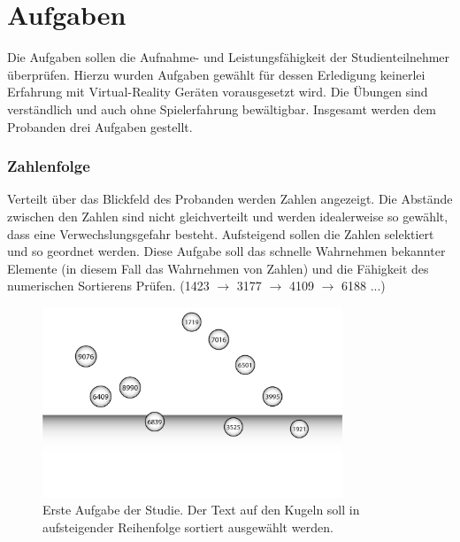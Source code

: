 \section{Aufgaben}\label{sec:tasks}
Die Aufgaben sollen die Aufnahme- und Leistungsfähigkeit der Studienteilnehmer überprüfen. Hierzu wurden Aufgaben gewählt für dessen Erledigung keinerlei Erfahrung mit Virtual-Reality Geräten vorausgesetzt wird. Die Übungen sind verständlich und auch ohne Spielerfahrung bewältigbar.
Insgesamt werden dem Probanden drei Aufgaben gestellt. 


\subsubsection{Zahlenfolge} 
Verteilt über das Blickfeld des Probanden werden Zahlen angezeigt. Die Abstände zwischen den Zahlen sind nicht gleichverteilt und werden idealerweise so gewählt, dass eine Verwechslungsgefahr besteht. Aufsteigend sollen die Zahlen selektiert und so geordnet werden. Diese Aufgabe soll das schnelle Wahrnehmen bekannter Elemente (in diesem Fall das Wahrnehmen von Zahlen) und die Fähigkeit des numerischen Sortierens Prüfen. 
(1423 $\rightarrow$ 3177 $\rightarrow$ 4109 $\rightarrow$ 6188 ...)

\begin{figure}[H]
	\centering
	\includegraphics[width=0.8\textwidth]{./images/ordering_abstract.png}
	\caption{Erste Aufgabe der Studie. Der Text auf den Kugeln soll in aufsteigender Reihenfolge sortiert ausgewählt werden.}
	\label{fig:ordeing_abstract}
\end{figure}

